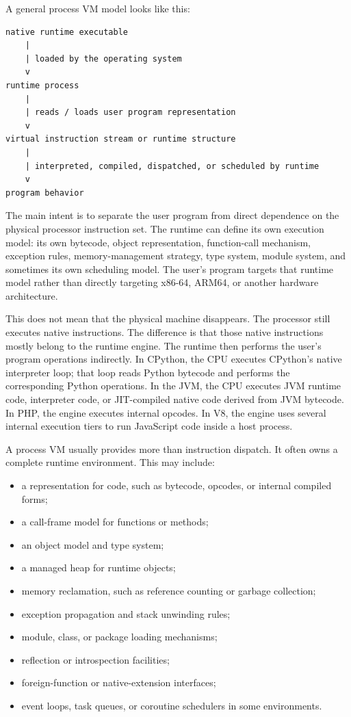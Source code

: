 A general process VM model looks like this:

\begin{verbatim}
native runtime executable
    |
    | loaded by the operating system
    v
runtime process
    |
    | reads / loads user program representation
    v
virtual instruction stream or runtime structure
    |
    | interpreted, compiled, dispatched, or scheduled by runtime
    v
program behavior
\end{verbatim}

The main intent is to separate the user program from direct dependence on the physical processor instruction set. The runtime can define its own execution model: its own bytecode, object representation, function-call mechanism, exception rules, memory-management strategy, type system, module system, and sometimes its own scheduling model. The user's program targets that runtime model rather than directly targeting x86-64, ARM64, or another hardware architecture.

This does not mean that the physical machine disappears. The processor still executes native instructions. The difference is that those native instructions mostly belong to the runtime engine. The runtime then performs the user's program operations indirectly. In CPython, the CPU executes CPython's native interpreter loop; that loop reads Python bytecode and performs the corresponding Python operations. In the JVM, the CPU executes JVM runtime code, interpreter code, or JIT-compiled native code derived from JVM bytecode. In PHP, the engine executes internal opcodes. In V8, the engine uses several internal execution tiers to run JavaScript code inside a host process.

A process VM usually provides more than instruction dispatch. It often owns a complete runtime environment. This may include:

\begin{itemize}
    \item a representation for code, such as bytecode, opcodes, or internal compiled forms;
    \item a call-frame model for functions or methods;
    \item an object model and type system;
    \item a managed heap for runtime objects;
    \item memory reclamation, such as reference counting or garbage collection;
    \item exception propagation and stack unwinding rules;
    \item module, class, or package loading mechanisms;
    \item reflection or introspection facilities;
    \item foreign-function or native-extension interfaces;
    \item event loops, task queues, or coroutine schedulers in some environments.
\end{itemize}

